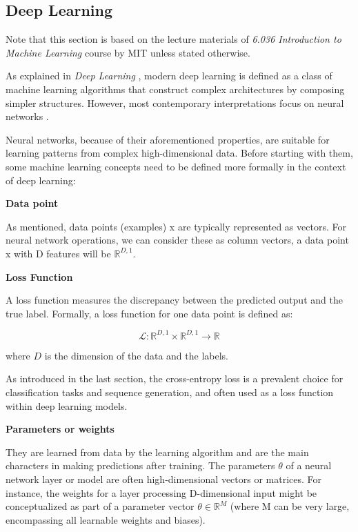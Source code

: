 \subsection{Deep Learning}
Note that this section is based on the lecture materials of \textit{6.036 Introduction to Machine Learning} course by MIT \cite{MITx6.036} unless stated otherwise.

As explained in \textit{Deep Learning} \cite{goodfellow2016deep}, modern deep learning is defined as a class of machine learning algorithms that construct complex architectures by composing simpler structures. However, most contemporary interpretations focus on neural networks \cite{goodfellow2016deep}.
     
    Neural networks, because of their aforementioned properties, are suitable for learning patterns from complex high-dimensional data. Before starting with them, some machine learning concepts need to be defined more formally in the context of deep learning:

    \textbf{Data point}

    As mentioned, data points (examples) x are typically represented as vectors. For neural network operations, we can consider these as column vectors, a data point x with D features will be ${\mathbb{R} ^ {D, 1}}$.

    \textbf{Loss Function}

A loss function measures the discrepancy between the predicted output and the true label. Formally, a loss function for one data point is defined as:

\begin{equation}
    \mathcal{L}: \mathbb{R}^{D, 1} \times \mathbb{R}^{D, 1} \rightarrow \mathbb{R}
\end{equation}

where \( D \) is the dimension of the data and the labels.

As introduced in the last section, the cross-entropy loss is a prevalent choice for classification tasks and sequence generation, and often used as a loss function within deep learning models.
    
    \textbf{Parameters or weights}
    
    They are learned from data by the learning algorithm and are the main characters in making predictions after training.
    The parameters $\theta$ of a neural network layer or model are often high-dimensional vectors or matrices. 
    For instance, the weights for a layer processing D-dimensional input might be conceptualized as part of a parameter vector $\theta \in \mathbb{R}^M$ (where M can be very large, encompassing all learnable weights and biases).

